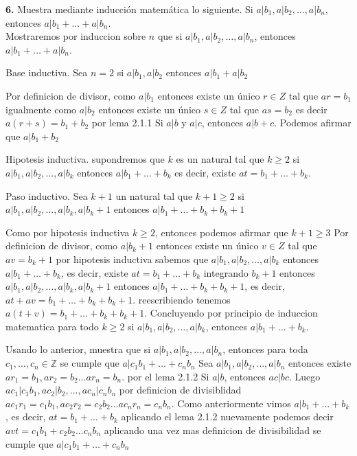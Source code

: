 \documentclass[12pt]{article}
\begin{document}
\begin{enumerate}
\begin{enumerate}
    \end{enumerate}
\end{enumerate}

\vspace{1cm}

%
%
\textbf{6.} Muestra mediante inducción matemática lo siguiente. Si $a | b_1, a | b_2, \dots, a | b_n$, entonces $a | b_1 + \dots + a | b_n$.\\

Mostraremos por induccion sobre $n$ que si $a | b_1, a | b_2, \dots, a | b_n$, entonces $a | b_1 + \dots + a | b_n$.

Base inductiva. Sea $n = 2$ si $a | b_1, a | b_2$ entonces $a | b_1 + a | b_2$

Por definicion de divisor, como $a | b_1$ entonces existe un único $r \in Z$ tal que $ar = b_1$
igualmente como $a | b_2$ entonces existe un único $s \in Z$ tal que $as = b_2$
es decir $a(r+s) = b_1 + b_2$
por lema 2.1.1 Si $a | b$ y $a | c$, entonces $a | b + c$. Podemos afirmar que $a | b_1 + b_2$

Hipotesis inductiva. supondremos que $k$ es un natural tal que $k \geq 2$ si $a | b_1, a | b_2, \dots, a | b_k$ entonces $a | b_1 + \dots + b_k$ es decir, existe $at = b_1 + \dots + b_k$.

Paso inductivo. Sea $k + 1$ un natural tal que $k + 1 \geq 2$ si $a | b_1, a | b_2, \dots, a | b_k, a | b_k+1$ entonces $a | b_1 + \dots + b_k + b_k+1$

Como por hipotesis inductiva $k \geq 2$, entonces podemos afirmar que $k+1 \geq 3$
Por definicion de divisor, como $a | b_k+1$ entonces existe un único $v \in Z$ tal que $av = b_k+1$
por hipotesis inductiva sabemos que $a | b_1, a | b_2, \dots, a | b_k$ entonces $a | b_1 + \dots + b_k$, es decir, existe $at = b_1 + \dots + b_k$
integrando $b_k+1$ entonces $a | b_1, a | b_2, \dots, a | b_k, a | b_k+1$ entonces $a | b_1 + \dots + b_k + b_k+1$, es decir, $at + av = b_1 + \dots + b_k + b_k+1$.
reescribiendo tenemos $a(t + v) = b_1 + \dots + b_k + b_k+1$.
Concluyendo por principio de induccion matematica  para todo $k \geq 2$ si $a | b_1, a | b_2, \dots, a | b_k$, entonces $a | b_1 + \dots + b_k $.
\vspace{1cm}

Usando lo anterior, muestra que si $a | b_1, a | b_2, \dots, a | b_n$, entonces para toda $c_1, \dots, c_n \in \mathbb{Z}$ se cumple que $a | c_1 b_1 + \dots + c_n b_n$
\vspace{1cm}
Sea $a | b_1, a | b_2, \dots, a | b_n$ entonces existe $ar_1 = b_1 , ar_2 = b_2 ... ar_n = b_n$.
por el lema 2.1.2 Si $a | b$, entonces $ac | bc$. Luego $ac_1 | c_1 b_1, ac_2 | b_2, . . . , ac_n | c_n b_n$ por definicion de divisiblidad $a c_1 r_1 = c_1 b_1 , a c_2 r_2 =  c_2 b_2 ... a c_n r_n = c_n b_n$.
Como anteriormente vimos $a | b_1 + \dots + b_k$, es decir, $at = b_1 + \dots + b_k$ aplicando el lema 2.1.2 nuevamente podemos decir $avt = c_1 b_1 + c_2 b_2 ... c_n b_n$
aplicando una vez mas definicion de divisibilidad
se cumple que $a | c_1 b_1 + \dots + c_n b_n$
\vspace{1cm}
\end{document}
